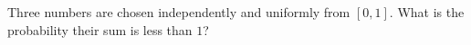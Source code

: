 Three numbers are chosen independently and uniformly from $[0,1]$. What is the probability their sum is less than $1$?

